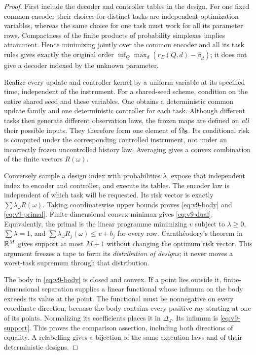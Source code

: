 \begin{proof}
First include the decoder and controller tables in the design. For one
fixed common encoder their choices for distinct tasks are independent
optimization variables, whereas the same choice for one task must work
for all its parameter rows. Compactness of the finite products of
probability simplexes implies attainment. Hence minimizing jointly over
the common encoder and all its task rules gives exactly the original
order $\inf_Q\max_d(r_E(Q,d)-\beta_d)$; it does not give a decoder
indexed by the unknown parameter.

Realize every update and controller kernel by a uniform variable at its
specified time, independent of the instrument. For a shared-seed scheme,
condition on the entire shared seed and these variables. One obtains a
deterministic common update family and one deterministic controller for
each task. Although different tasks then generate different observation
laws, the frozen maps are defined on \emph{all} their possible inputs.
They therefore form one element of $\Omega_{\bf S}$. Its conditional
risk is computed under the corresponding controlled instrument, not
under an incorrectly frozen uncontrolled history law. Averaging gives a
convex combination of the finite vectors $R(\omega)$.

Conversely sample a design index with probabilities $\lambda$, expose
that independent index to encoder and controller, and execute its tables.
The encoder law is independent of which task will be requested. Its risk
vector is exactly $\sum\lambda_\omega R(\omega)$. Taking coordinatewise
upper bounds proves \eqref{eq:v9-body} and \eqref{eq:v9-primal}.
Finite-dimensional convex minimax gives \eqref{eq:v9-dual}. Equivalently,
the primal is the linear programme minimizing $v$ subject to
$\lambda\ge0$, $\sum\lambda=1$, and
$\sum\lambda_\omega R_j(\omega)\le v+b_j$ for every row.
Carath\'eodory's theorem in $\mathbb R^M$ gives support at most $M+1$ without
changing the optimum risk vector. This argument freezes a tape to form
its \emph{distribution of designs}; it never moves a worst-task
supremum through that distribution.

The body in \eqref{eq:v9-body} is closed and convex. If a point lies
outside it, finite-dimensional separation supplies a linear functional
whose infimum on the body exceeds its value at the point. The functional
must be nonnegative on every coordinate direction, because the body
contains every positive ray starting at one of its points. Normalizing
its coefficients places it in $\Delta_J$. Its infimum is
\eqref{eq:v9-support}. This proves the comparison assertion, including
both directions of equality. A relabelling gives a bijection of the
same execution laws and of their deterministic designs.


\end{proof}
